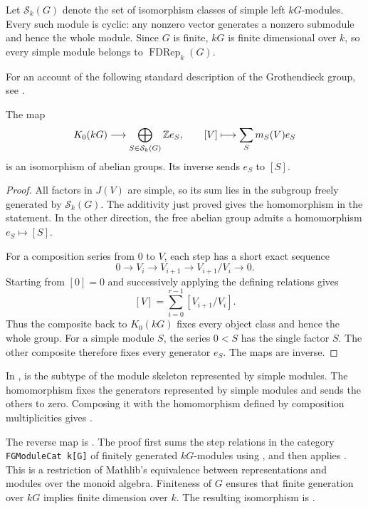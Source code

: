 Let $\mathcal S_k(G)$ denote the set of isomorphism classes of simple left
$kG$-modules. Every such module is cyclic: any nonzero vector generates a
nonzero submodule and hence the whole module. Since $G$ is finite, $kG$ is
finite dimensional over $k$, so every simple module belongs to
$\operatorname{FDRep}_k(G)$.

For an account of the following standard description of the Grothendieck
group, see \cite[\S14.1, Proposition~40]{Serre1977}.

\begin{theorem}
\label{lib:kzero:basis-theorem}
The map
\[
 K_0(kG)\longrightarrow\bigoplus_{S\in\mathcal S_k(G)}\mathbb Z e_S,
 \qquad [V]\longmapsto\sum_S m_S(V)e_S
\]
is an isomorphism of abelian groups. Its inverse sends $e_S$ to $[S]$.
\end{theorem}
\begin{proof}
All factors in $J(V)$ are simple, so its sum lies in the subgroup freely
generated by $\mathcal S_k(G)$. The additivity just proved gives the
homomorphism in the statement. In the other direction, the free abelian
group admits a homomorphism $e_S\mapsto[S]$.

For a composition series from $0$ to $V$, each step has a short exact sequence
\[
 0\longrightarrow V_i\longrightarrow V_{i+1}
 \longrightarrow V_{i+1}/V_i\longrightarrow0.
\]
Starting from $[0]=0$ and successively applying the defining relations gives
\[
 [V]=\sum_{i=0}^{r-1}[V_{i+1}/V_i].
\]
Thus the composite back to $K_0(kG)$ fixes every object class and hence the
whole group. For a simple module $S$, the series $0<S$ has the single
factor $S$. The other composite therefore
fixes every generator $e_S$. The maps are inverse.
\end{proof}

\begin{implementation}
In ,
 is the subtype of the module skeleton represented
by simple modules. The homomorphism  fixes the
generators represented by simple modules and sends the others to zero.
Composing it with the homomorphism defined by composition multiplicities gives
.

The reverse map is .
The proof first sums the step relations in the category
{\small\texttt{FGModuleCat k[G]}} of finitely generated $kG$-modules using
, and then applies
.
This is a restriction of Mathlib's equivalence between representations
and modules over the monoid algebra. Finiteness of $G$ ensures that finite
generation over $kG$ implies finite dimension over $k$. The resulting
isomorphism is
.
\end{implementation}

